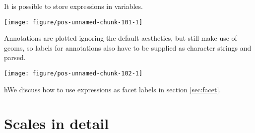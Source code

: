 \documentclass[paper=a4,10pt,div=17,headsepline,BCOR=12mm,twoside,open=right]{scrbook}\usepackage{knitr}
\begin{document}
It is possible to store expressions in variables.

\begin{knitrout}\footnotesize
{}\color{fgcolor}\begin{kframe}
\begin{alltt}
 \hlkwb{<-} \hlstd{(}\hlstd{(alpha[}\hlstd{]} \hlopt{+} 
 \hlopt{+} \hlstd{(}
\end{alltt}
\end{kframe}

{\centering \texttt{[image: figure/pos-unnamed-chunk-101-1]} 

}



\end{knitrout}

Annotations are plotted ignoring the default aesthetics, but still make use of geoms, so labels for annotations also have to be supplied as character strings and parsed.

\begin{knitrout}\footnotesize
{}\color{fgcolor}\begin{kframe}
\begin{alltt}
 \hlopt{+} \hlstd{(}\hlstd{,}\hlstd{)} \hlopt{+}
  \hlstd{(}\hlstd{,} \hlstd{=}\hlstd{,}
           \hlstd{=}\hlstd{,} \hlstd{=}\hlstd{,} \hlstd{=}\hlstd{,} \hlstd{=}\hlstd{,} \hlstd{=}\hlstd{)}
\end{alltt}
\end{kframe}

{\centering \texttt{[image: figure/pos-unnamed-chunk-102-1]} 

}



\end{knitrout}

hWe discuss how to use expressions as facet labels in section \ref{sec:facet}.

\section{Scales in detail}
\end{document}
